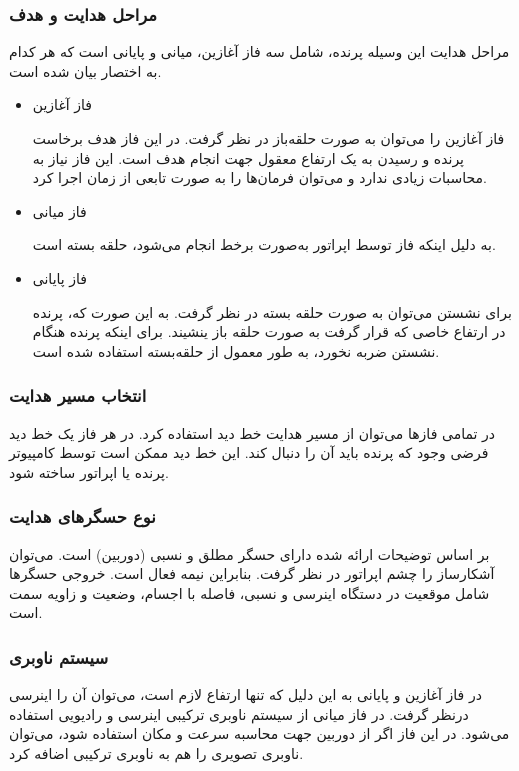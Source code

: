 \subsubsection{مراحل هدایت و هدف}
مراحل هدایت این وسیله پرنده، شامل سه فاز آغازین، میانی و پایانی است که هر کدام به اختصار بیان شده است.
\begin{itemize}
	\item فاز آغازین
	
	فاز آغازین را می‌توان به صورت حلقه‌باز در نظر گرفت. در این فاز هدف برخاست
	پرنده و رسیدن به یک ارتفاع معقول جهت انجام هدف است. 
	این فاز نیاز به محاسبات زیادی ندارد و می‌توان فرمان‌ها را به صورت تابعی از زمان اجرا کرد.
	
	\item فاز میانی
	
	به دلیل اینکه فاز توسط اپراتور به‌صورت برخط انجام می‌شود، حلقه بسته است.
	
	\item فاز پایانی
	
	برای نشستن
	می‌توان به صورت حلقه بسته در نظر گرفت. به این صورت که، پرنده در ارتفاع خاصی که قرار گرفت به صورت حلقه باز ینشیند. برای اینکه پرنده هنگام نشستن ضربه نخورد، به طور معمول از حلقه‌‌بسته استفاده شده است.
\end{itemize}

\subsubsection{انتخاب مسیر هدایت}

در تمامی فازها می‌توان از مسیر هدایت خط دید استفاده کرد. در هر فاز یک خط دید فرضی وجود که پرنده باید آن را دنبال کند. این خط دید ممکن است توسط کامپیوتر پرنده یا اپراتور ساخته شود.
\subsubsection{نوع حسگرهای هدایت}
بر اساس توضیحات ارائه شده دارای حسگر مطلق و نسبی (دوربین) است. می‌توان آشکارساز را چشم اپراتور در نظر گرفت. بنابراین نیمه فعال است.
خروجی حسگرها شامل موقعیت در دستگاه اینرسی و نسبی، فاصله با اجسام،  وضعیت و زاویه سمت است.
\subsubsection{سیستم ناوبری}
در فاز آغازین و پایانی به این دلیل که تنها ارتفاع لازم است، می‌توان آن را اینرسی درنظر گرفت. در فاز میانی از سیستم ناوبری ترکیبی اینرسی و رادیویی استفاده می‌شود. در این فاز اگر از دوربین جهت محاسبه سرعت و مکان استفاده شود، می‌توان ناوبری تصویری را هم به ناوبری ترکیبی اضافه کرد.

